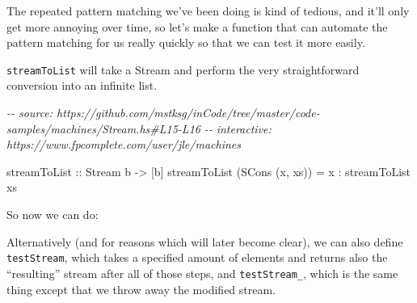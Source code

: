 \documentclass[]{article}
\newenvironment{Shaded}{}{}
\newcommand{\CommentTok}[1]{\textcolor[rgb]{0.38,0.63,0.69}{\textit{#1}}}
\newcommand{\DataTypeTok}[1]{\textcolor[rgb]{0.56,0.13,0.00}{#1}}
\newcommand{\DecValTok}[1]{\textcolor[rgb]{0.25,0.63,0.44}{#1}}
\newcommand{\FunctionTok}[1]{\textcolor[rgb]{0.02,0.16,0.49}{#1}}
\newcommand{\NormalTok}[1]{#1}
\newcommand{\OperatorTok}[1]{\textcolor[rgb]{0.40,0.40,0.40}{#1}}
\newcommand{\OtherTok}[1]{\textcolor[rgb]{0.00,0.44,0.13}{#1}}
\begin{document}
The repeated pattern matching we've been doing is kind of tedious, and it'll
only get more annoying over time, so let's make a function that can automate the
pattern matching for us really quickly so that we can test it more easily.

\texttt{streamToList} will take a Stream and perform the very straightforward
conversion into an infinite list.

\begin{Shaded}
\begin{Highlighting}[]
\CommentTok{{-}{-} source: https://github.com/mstksg/inCode/tree/master/code{-}samples/machines/Stream.hs\#L15{-}L16}
\CommentTok{{-}{-} interactive: https://www.fpcomplete.com/user/jle/machines}

\OtherTok{streamToList ::} \DataTypeTok{Stream}\NormalTok{ b }\OtherTok{{-}\textgreater{}}\NormalTok{ [b]}
\NormalTok{streamToList (}\DataTypeTok{SCons}\NormalTok{ (x, xs)) }\OtherTok{=}\NormalTok{ x }\OperatorTok{:}\NormalTok{ streamToList xs}
\end{Highlighting}
\end{Shaded}

So now we can do:

\begin{Shaded}
\end{Shaded}

Alternatively (and for reasons which will later become clear), we can also
define \texttt{testStream}, which takes a specified amount of elements and
returns also the ``resulting'' stream after all of those steps, and
\texttt{testStream\_}, which is the same thing except that we throw away the
modified stream.
\end{document}

